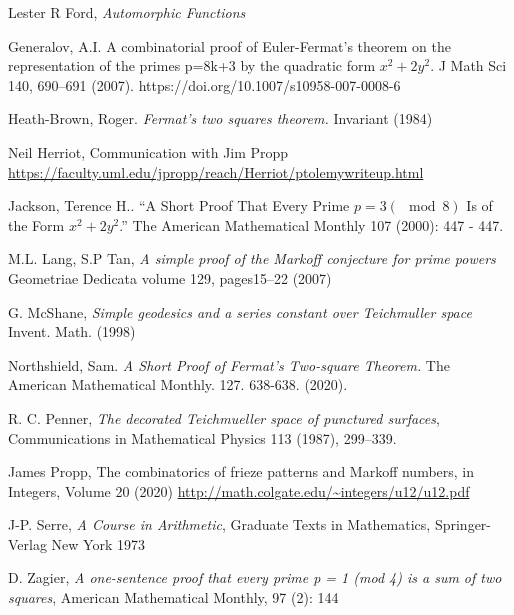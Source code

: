 \documentclass[12pt,a4paper]{amsart}
\begin{document}
Lester R Ford,
\textit{Automorphic Functions}

Generalov, A.I. A combinatorial proof of Euler-Fermat’s theorem on the representation of the primes p=8k+3 by the quadratic form $x^2 + 2y^2$. J Math Sci 140, 690–691 (2007). https://doi.org/10.1007/s10958-007-0008-6

Heath-Brown, Roger. 
\textit{ Fermat’s two squares theorem.} Invariant (1984) 

Neil Herriot, Communication with Jim Propp
\url{https://faculty.uml.edu/jpropp/reach/Herriot/ptolemywriteup.html}

Jackson, Terence H.. “A Short Proof That Every Prime $p = 3 (\mod 8)$
Is of the Form $x^2 + 2y^2$.” The American Mathematical Monthly 107 (2000): 447 - 447.



M.L. Lang, S.P Tan,
\textit{A simple proof of the Markoff conjecture for prime powers}
Geometriae Dedicata volume 129, pages15–22 (2007)


G. McShane,
\textit{Simple geodesics and a series constant over Teichmuller space}
Invent. Math. (1998)


Northshield, Sam. 
\textit{A Short Proof of Fermat’s Two-square Theorem.} The American Mathematical Monthly. 127. 638-638. (2020). 


R. C. Penner, 
\textit{The decorated Teichmueller space of punctured surfaces}, 
Communications in Mathematical Physics 113 (1987), 299–339.


James Propp,
The combinatorics of frieze patterns and Markoff numbers,
in  Integers, Volume 20 (2020)
\url{http://math.colgate.edu/~integers/u12/u12.pdf}


J-P. Serre,
\textit{A Course in Arithmetic},
Graduate Texts in Mathematics,
Springer-Verlag New York
1973


D. Zagier,
 \textit{A one-sentence proof that every prime p = 1 (mod 4) is a sum of two squares}, 
 American Mathematical Monthly, 97 (2): 144
 
 






 
\end{document}
